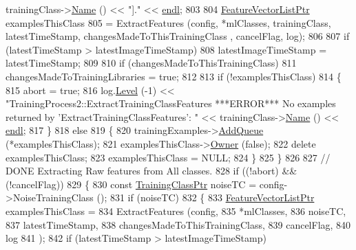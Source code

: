 \begin{DoxyCode}
      trainingClass->\hyperlink{class_k_k_m_l_l_1_1_training_class_ae10b765db09d3aadabdffa35960c906a}{Name} () << \textcolor{stringliteral}{"]."} << \hyperlink{namespace_k_k_b_ad1f50f65af6adc8fa9e6f62d007818a8}{endl};
803 
804     \hyperlink{class_k_k_m_l_l_1_1_feature_vector_list}{FeatureVectorListPtr}  examplesThisClass 
805       = ExtractFeatures (config, *mlClasses, trainingClass, latestTimeStamp, changesMadeToThisTrainingClass
      , cancelFlag, log);
806 
807     \textcolor{keywordflow}{if}  (latestTimeStamp > latestImageTimeStamp)
808       latestImageTimeStamp = latestTimeStamp;
809 
810     \textcolor{keywordflow}{if}  (changesMadeToThisTrainingClass)
811       changesMadeToTrainingLibraries = \textcolor{keyword}{true};
812 
813     \textcolor{keywordflow}{if}  (!examplesThisClass)
814     \{
815       abort = \textcolor{keyword}{true};
816       log.\hyperlink{class_k_k_b_1_1_run_log_a32cf761d7f2e747465fd80533fdbb659}{Level} (-1) << \textcolor{stringliteral}{"TrainingProcess2::ExtractTrainingClassFeatures   ***ERROR***   No examples
       returned by 'ExtractTrainingClassFeatures': "} << trainingClass->\hyperlink{class_k_k_m_l_l_1_1_training_class_ae10b765db09d3aadabdffa35960c906a}{Name} ()  << 
      \hyperlink{namespace_k_k_b_ad1f50f65af6adc8fa9e6f62d007818a8}{endl};
817     \}
818     \textcolor{keywordflow}{else}
819     \{
820       trainingExamples->\hyperlink{class_k_k_m_l_l_1_1_feature_vector_list_a90809e07f7e33e591da0d266c1907ca9}{AddQueue} (*examplesThisClass);
821       examplesThisClass->\hyperlink{class_k_k_b_1_1_k_k_queue_a4990d037ff09dd504cc7df53819bf61a}{Owner} (\textcolor{keyword}{false});
822       \textcolor{keyword}{delete}  examplesThisClass;
823       examplesThisClass = NULL;
824     \}
825   \}
826 
827   \textcolor{comment}{// DONE Extracting Raw features from All classes.}
828   \textcolor{keywordflow}{if}  ((!abort)  &&  (!cancelFlag))
829   \{
830     \textcolor{keyword}{const} \hyperlink{class_k_k_m_l_l_1_1_training_class}{TrainingClassPtr}  noiseTC = config->NoiseTrainingClass ();
831     \textcolor{keywordflow}{if}  (noiseTC)
832     \{
833       \hyperlink{class_k_k_m_l_l_1_1_feature_vector_list}{FeatureVectorListPtr}  examplesThisClass  = 
834             ExtractFeatures (config, 
835                              *mlClasses, 
836                              noiseTC,
837                              latestTimeStamp,
838                              changesMadeToThisTrainingClass,
839                              cancelFlag,
840                              log
841                             );
842       \textcolor{keywordflow}{if}  (latestTimeStamp > latestImageTimeStamp)

\end{DoxyCode}
